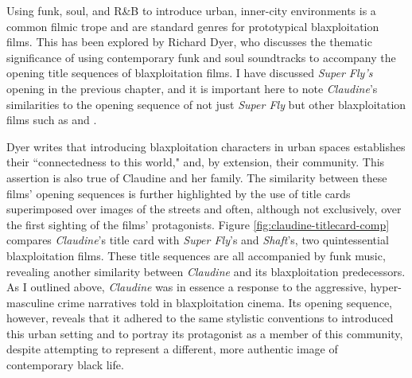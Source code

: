 Using funk, soul, and R\&B to introduce urban, inner-city environments is a common filmic trope and are standard genres for prototypical blaxploitation films.
This has been explored by Richard Dyer, who discusses the thematic significance of using contemporary funk and soul soundtracks to accompany the opening title sequences of blaxploitation films. 
I have discussed \textit{Super Fly's} opening in the previous chapter, and it is important here to note \textit{Claudine}'s similarities to the opening sequence of not just \textit{Super Fly} but other blaxploitation films such as \textcite{parks_shaft_1971} and \textcite{cohen_black_1973}.

Dyer writes that introducing blaxploitation characters in urban spaces establishes their ``connectedness to this world," and, by extension, their community.\autocite[][156]{dyer_space_2012}
This assertion is also true of Claudine and her family.
The similarity between these films' opening sequences is further highlighted by the use of title cards superimposed over images of the streets and often, although not exclusively, over the first sighting of the films' protagonists.
Figure \ref{fig:claudine-titlecard-comp} compares \textit{Claudine}'s title card with \textit{Super Fly}'s and \textit{Shaft}'s, two quintessential blaxploitation films.
These title sequences are all accompanied by funk music, revealing another similarity between \textit{Claudine} and its blaxploitation predecessors.
As I outlined above, \textit{Claudine} was in essence a response to the aggressive, hyper-masculine crime narratives told in blaxploitation cinema.
Its opening sequence, however, reveals that it adhered to the same stylistic conventions to introduced this urban setting and to portray its protagonist as a member of this community, despite attempting to represent a different, more authentic image of contemporary black life.


